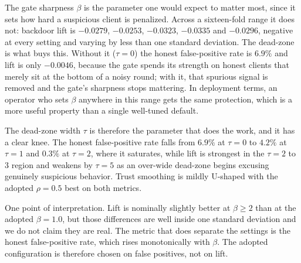 \documentclass[journal]{IEEEtran}
\begin{document}
The gate sharpness $\beta$ is the parameter one would expect to matter most,
since it sets how hard a suspicious client is penalized. Across a sixteen-fold
range it does not: backdoor lift is $-0.0279$, $-0.0253$, $-0.0323$, $-0.0335$ and $-0.0296$, negative at every
setting
and varying by less than one standard deviation. The dead-zone is what buys
this. Without it ($\tau = 0$) the honest false-positive rate is
$6.9\%$ and lift is only $-0.0046$, because the gate spends its
strength on honest clients that merely sit at the bottom of a noisy round;
with it, that spurious signal is removed and the gate's sharpness stops
mattering. In deployment terms, an operator who sets $\beta$ anywhere in this
range gets the same protection, which is a more useful property than a single
well-tuned default.

The dead-zone width $\tau$ is therefore the parameter that does the work, and
it has a clear knee. The honest false-positive rate falls from $6.9\%$
at $\tau = 0$ to $4.2\%$ at $\tau = 1$ and $0.3\%$ at
$\tau = 2$, where it saturates, while lift is strongest in the $\tau = 2$ to
$3$ region and weakens by $\tau = 5$ as an over-wide dead-zone begins excusing
genuinely suspicious behavior. Trust smoothing is mildly U-shaped with the
adopted $\rho = 0.5$ best on both metrics.

One point of interpretation. Lift is nominally slightly better at
$\beta \geq 2$ than at the adopted $\beta = 1.0$, but those differences are
well inside one standard deviation and we do not claim they are real. The
metric that does separate the settings is the honest false-positive rate,
which rises monotonically with $\beta$. The adopted configuration is therefore
chosen on false positives, not on lift.
\end{document}
